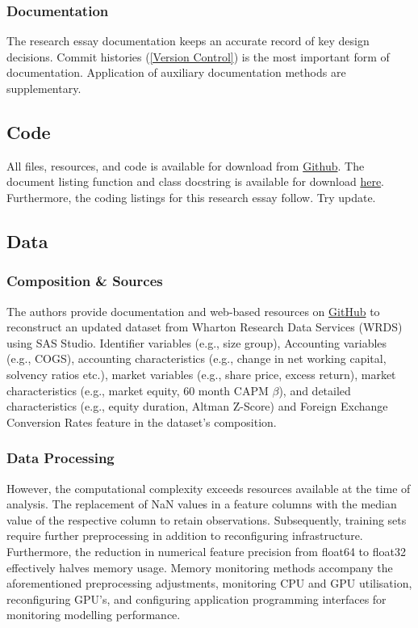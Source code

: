 \documentclass[12pt]{article}
\begin{document}
\subsubsection{Documentation}
The research essay documentation keeps an accurate record of key design decisions.
Commit histories (\ref{Version Control}) is the most important form of documentation.
Application of auxiliary documentation methods are supplementary.
\subsection{Code} \label{code}
All files, resources, and code is available for download from \href{https://github.com/CMCD1996/finance-honours}{Github}.
The document listing function and class docstring is available for download \href{/Users/connor/Google Drive/Documents/Professional/Projects/Portfolio/downloads/wip.pdf}{here}.
Furthermore, the coding listings for this research essay follow. Try update.
% 
\subsection{Data} \label{dss}
\subsubsection{Composition \& Sources}
The authors provide documentation and web-based resources on \href{https://github.com/bkelly-lab/ReplicationCrisis}{GitHub} to reconstruct an updated dataset from Wharton Research Data Services (WRDS) using SAS Studio.
Identifier variables (e.g., size group), Accounting variables (e.g., COGS), accounting characteristics (e.g., change in net working capital, solvency ratios etc.), market variables (e.g., share price, excess return), market characteristics (e.g., market equity, 60 month CAPM $\beta$), 
and detailed characteristics (e.g., equity duration, Altman Z-Score) and Foreign Exchange Conversion Rates feature in the dataset's composition.
\subsubsection{Data Processing} \label{data-processing}
However, the computational complexity exceeds resources available at the time of analysis.
The replacement of NaN values in a feature columns with the median value of the respective column to retain observations.
Subsequently, training sets require further preprocessing in addition to reconfiguring infrastructure.
Furthermore, the reduction in numerical feature precision from float64 to float32 effectively halves memory usage. 
Memory monitoring methods accompany the aforementioned preprocessing adjustments, monitoring CPU and GPU utilisation, reconfiguring GPU's, and configuring application programming interfaces for monitoring modelling performance.
\end{document}
